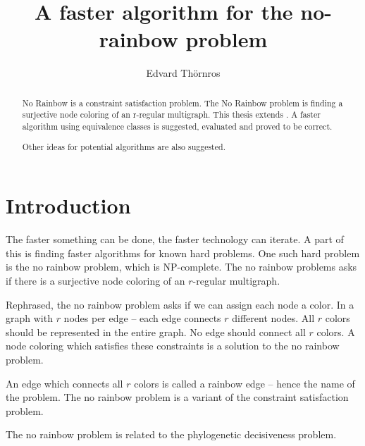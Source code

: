 \documentclass{article}
\title{A faster algorithm for the no-rainbow problem}
\author{Edvard Thörnros}
\begin{document}
\maketitle

\begin{abstract}

No Rainbow is a constraint satisfaction problem.
The No Rainbow problem is finding a surjective node coloring of an r-regular multigraph.
This thesis extends \cite{sourceNoRainbow}.
A faster algorithm using equivalence classes is suggested, evaluated and proved to be correct.

Other ideas for potential algorithms are also suggested.

\end{abstract}

\section{Introduction}
The faster something can be done, the faster technology can iterate.
A part of this is finding faster algorithms for known hard problems.
One such hard problem is the no rainbow problem, which is NP-complete\cite{sourceNoRainbow}.
The no rainbow problems asks if there is a surjective node coloring of an $r$-regular multigraph.

Rephrased, the no rainbow problem asks if we can assign each node a color.
In a graph with $r$ nodes per edge -- each edge connects $r$ different nodes.
All $r$ colors should be represented in the entire graph.
No edge should connect all $r$ colors.
A node coloring which satisfies these constraints is a solution to the no rainbow problem.

An edge which connects all $r$ colors is called a rainbow edge -- hence the name of the problem.
The no rainbow problem is a variant of the constraint satisfaction problem.

The no rainbow problem is related to the phylogenetic decisiveness problem. \cite{sourcePhylogeneticDecisiveness}

\end{document}
